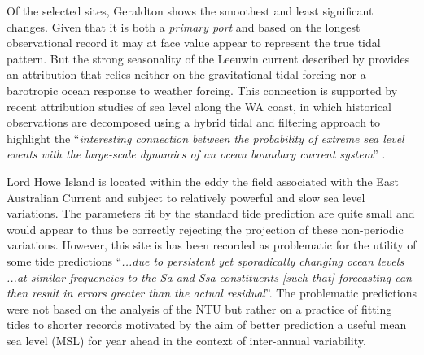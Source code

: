 Of the selected sites, Geraldton shows the smoothest and least significant changes.  Given that it is both a \textit{primary port} and based on the longest observational record it may at face value appear to represent the true tidal pattern. But the strong seasonality of the Leeuwin current described by \citeauthor{Ridgway:2004kb} provides an attribution that relies neither on the gravitational tidal forcing nor a barotropic ocean response to weather forcing. %
This connection is supported by recent attribution studies of sea level along the WA coast, in which historical observations are decomposed using a hybrid tidal and filtering approach to highlight the ``\textit{interesting connection between the probability of extreme sea level events with the large-scale dynamics of an ocean boundary current system}'' \citep{10.1029/2020ef001620}.

Lord Howe Island is located within the eddy the field associated with the East Australian Current and subject to relatively powerful and slow sea level variations.    The parameters fit by the standard tide prediction are quite small and would appear to thus be correctly rejecting the projection of these  non-periodic variations.   However, this site is has been recorded as problematic for the utility of some tide predictions ``\textit{...due to persistent yet sporadically changing ocean levels ...at similar frequencies to the Sa and Ssa constituents [such that] forecasting can then result in errors greater than the actual residual}''\citep{MHL2156}.  The problematic predictions were not based on the analysis of the NTU but rather on a practice of fitting tides to shorter records motivated by the aim of better prediction a useful mean sea level (MSL) for year ahead in the context of inter-annual variability.

